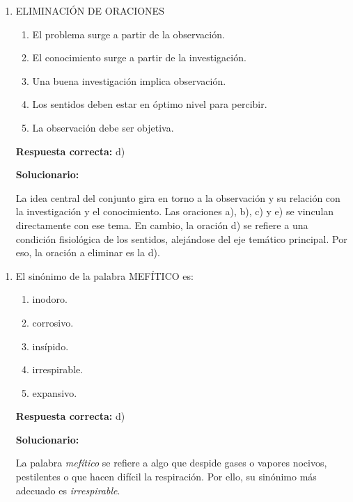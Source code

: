 \begin{enumerate}[resume]
	
	\item ELIMINACIÓN DE ORACIONES
	
	\begin{enumerate}[label=\alph*)]
		\item El problema surge a partir de la observación.
		\item El conocimiento surge a partir de la investigación.
		\item Una buena investigación implica observación.
		\item Los sentidos deben estar en óptimo nivel para percibir.
		\item La observación debe ser objetiva.
	\end{enumerate}
	
	\textbf{Respuesta correcta:} d)
	
	\vspace{2mm}
	\textbf{Solucionario:}
	
	La idea central del conjunto gira en torno a la observación y su relación con la investigación y el conocimiento. Las oraciones a), b), c) y e) se vinculan directamente con ese tema. En cambio, la oración d) se refiere a una condición fisiológica de los sentidos, alejándose del eje temático principal. Por eso, la oración a eliminar es la d).
	
\end{enumerate}

\begin{enumerate}[resume]
	
	\item El sinónimo de la palabra MEFÍTICO es:
	
	\begin{enumerate}[label=\alph*)]
		\item inodoro.
		\item corrosivo.
		\item insípido.
		\item irrespirable.
		\item expansivo.
	\end{enumerate}
	
	\textbf{Respuesta correcta:} d)
	
	\vspace{2mm}
	\textbf{Solucionario:}
	
	La palabra \textit{mefítico} se refiere a algo que despide gases o vapores nocivos, pestilentes o que hacen difícil la respiración. Por ello, su sinónimo más adecuado es \textit{irrespirable}.
	
\end{enumerate}

